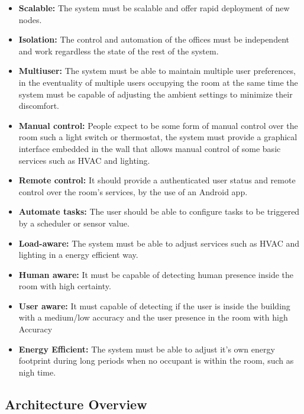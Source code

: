 \begin{itemize}
  \item \textbf{Scalable:} The system must be scalable and offer rapid deployment of new nodes.
  \item \textbf{Isolation:} The control and automation of the offices must be independent and work regardless the state of the rest of the system.
  \item \textbf{Multiuser:} The system must be able to maintain multiple user preferences, in the eventuality of multiple users occupying the room at the same time the system must be capable of adjusting the ambient settings to minimize their discomfort. 
  \item \textbf{Manual control:} People expect to be some form of manual control over the room such a light switch or thermostat, the system must provide a graphical interface embedded in the wall that allows manual control of some basic services such as HVAC and lighting.
  
  \item \textbf{Remote control:} It should provide a authenticated user status and remote control over the room's services, by the use of an Android app.
  \item \textbf{Automate tasks:} The user should be able to configure tasks to be triggered by a scheduler or sensor value.
  \item \textbf{Load-aware:} The system must be able to adjust services such as HVAC and lighting in a energy efficient way.
  \item \textbf{Human aware:} It must be capable of detecting human presence inside the room with high certainty.
  \item \textbf{User aware:} It must capable of detecting if the user is inside the building with a medium/low accuracy and the user presence in the room with high Accuracy
  \item \textbf{Energy Efficient:} The system must be able to adjust it's own energy footprint during long periods when no occupant is within the room, such as nigh time.  
  
\end{itemize}




\subsection{Architecture Overview}\label{architecture2} 




